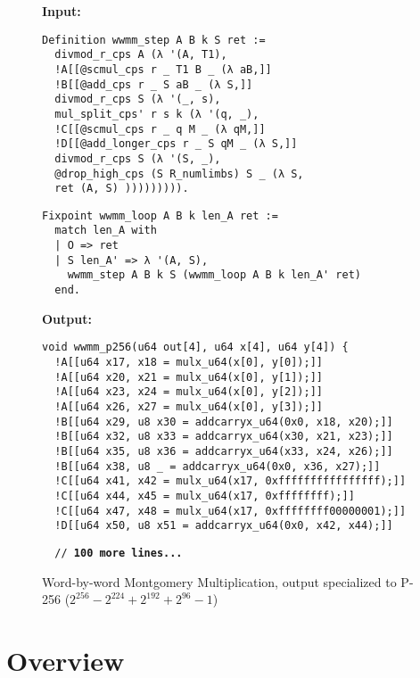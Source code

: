 \documentclass[conference,letterpaper]{IEEEtran}
\begin{document}
\begin{figure}
\footnotesize
\enableverbatimcolors
\textbf{Input:}
\begin{verbatim}
Definition wwmm_step A B k S ret :=
  divmod_r_cps A (λ '(A, T1),
  !A[[@scmul_cps r _ T1 B _ (λ aB,]]
  !B[[@add_cps r _ S aB _ (λ S,]]
  divmod_r_cps S (λ '(_, s),
  mul_split_cps' r s k (λ '(q, _),
  !C[[@scmul_cps r _ q M _ (λ qM,]]
  !D[[@add_longer_cps r _ S qM _ (λ S,]]
  divmod_r_cps S (λ '(S, _),
  @drop_high_cps (S R_numlimbs) S _ (λ S,
  ret (A, S) ))))))))).
\end{verbatim}
\begin{verbatim}
Fixpoint wwmm_loop A B k len_A ret :=
  match len_A with
  | O => ret
  | S len_A' => λ '(A, S),
    wwmm_step A B k S (wwmm_loop A B k len_A' ret)
  end.
\end{verbatim}
\textbf{Output:}
\begin{verbatim}
void wwmm_p256(u64 out[4], u64 x[4], u64 y[4]) {
  !A[[u64 x17, x18 = mulx_u64(x[0], y[0]);]]
  !A[[u64 x20, x21 = mulx_u64(x[0], y[1]);]]
  !A[[u64 x23, x24 = mulx_u64(x[0], y[2]);]]
  !A[[u64 x26, x27 = mulx_u64(x[0], y[3]);]]
  !B[[u64 x29, u8 x30 = addcarryx_u64(0x0, x18, x20);]]
  !B[[u64 x32, u8 x33 = addcarryx_u64(x30, x21, x23);]]
  !B[[u64 x35, u8 x36 = addcarryx_u64(x33, x24, x26);]]
  !B[[u64 x38, u8 _ = addcarryx_u64(0x0, x36, x27);]]
  !C[[u64 x41, x42 = mulx_u64(x17, 0xffffffffffffffff);]]
  !C[[u64 x44, x45 = mulx_u64(x17, 0xffffffff);]]
  !C[[u64 x47, x48 = mulx_u64(x17, 0xffffffff00000001);]]
  !D[[u64 x50, u8 x51 = addcarryx_u64(0x0, x42, x44);]]
\end{verbatim}
  \vspace{-1.8mm}
\verb|  // |\textbf{\texttt{100 more lines...}}
  \caption{\label{top-level-example} Word-by-word Montgomery Multiplication, output specialized to P-256 ($2^{256} - 2^{224} + 2^{192} + 2^{96} - 1$)}
\end{figure}

\section{\label{overview}Overview}
\end{document}
